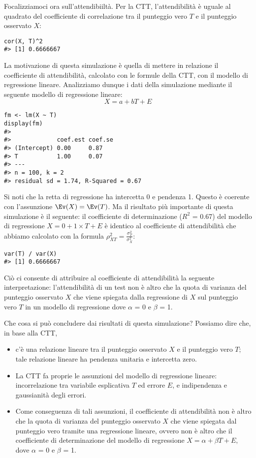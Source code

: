 Focalizziamoci ora sull'attendibiiltà.
Per la CTT, l'attendibilità è uguale al quadrato del coefficiente di correlazione tra il punteggio vero $T$ e il punteggio osservato $X$:
\begin{lstlisting}
cor(X, T)^2
#> [1] 0.6666667
\end{lstlisting}
La motivazione di questa simulazione è quella di mettere in relazione il coefficiente di attendibilità, calcolato con le formule della CTT, con il modello di regressione lineare.
Analizziamo dunque i dati della simulazione mediante il seguente modello di regressione lineare:
\[
X = a + b T + E
\]
\begin{lstlisting}
fm <- lm(X ~ T)
display(fm)
#> 
#>             coef.est coef.se
#> (Intercept) 0.00     0.87
#> T           1.00     0.07
#> ---
#> n = 100, k = 2
#> residual sd = 1.74, R-Squared = 0.67
\end{lstlisting}
Si noti che la retta di regressione ha intercetta 0 e pendenza 1.
Questo è coerente con l'assunzione $\Ev(X) = \Ev(T)$. 
Ma il risultato più importante di questa simulazione è il seguente: il coefficiente di determinazione ($R^2$ = 0.67) del modello di regressione $X = 0 + 1 \times T + E$ è identico al coefficiente di attendibilità che abbiamo calcolato con la formula $\rho_{XT}^2 = \frac{\sigma_{T}^2}{\sigma_X^2}$:
\begin{lstlisting}
var(T) / var(X)
#> [1] 0.6666667
\end{lstlisting}
Ciò ci consente di attribuire al coefficiente di attendibilità la seguente interpretazione: l'attendibilità di un test non è altro che la quota di varianza del punteggio osservato $X$ che viene spiegata dalla regressione di $X$ sul punteggio vero $T$ in un modello di regressione dove $\alpha$ = 0 e $\beta$ = 1. 


Che cosa si può concludere dai risultati di questa simulazione? 
Possiamo dire che, in base alla CTT, 
\begin{itemize}
\item c'è una relazione lineare tra il punteggio osservato $X$ e il punteggio vero $T$;  tale relazione lineare ha pendenza unitaria e intercetta zero. 
\item La CTT fa proprie le assunzioni del modello di regressione lineare: incorrelazione tra variabile esplicativa $T$ ed errore $E$, e indipendenza e gaussianità  degli errori. 
\item Come conseguenza di tali assunzioni, il coefficiente di attendibilità non è altro che la quota di varianza del punteggio osservato $X$ che viene spiegata dal punteggio vero tramite una regressione lineare, ovvero non è altro che il coefficiente di determinazione del modello di regressione 
$
X = \alpha + \beta T + E,
$
dove $\alpha$ = 0 e $\beta$ = 1.
\end{itemize}

